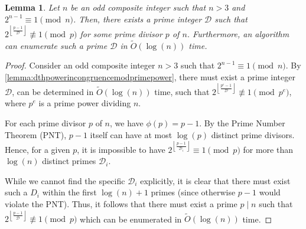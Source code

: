 \documentclass{article}
\theoremstyle{plain}
\theoremstyle{definition}
\newtheorem{lemma}{Lemma}
\newcommand{\floor}[1]{\left\lfloor #1 \right\rfloor}
\newcommand{\totient}[1]{\phi\left({#1}\right)}
\newcommand{\D}{\mathcal{D}}
\newcommand{\primep}{p}
\begin{document}
\begin{lemma}\label{lemma:dthpowerincongruencemodprime}
\textit{Let $n$ be an odd composite integer such that $n > 3$ and $2^{n-1} \equiv 1 \pmod{n}$. Then, there exists a prime integer $\D$ such that $2^{\floor{\frac{\primep-1}{\D}}} \not\equiv 1 \pmod{\primep}$ for some prime divisor $\primep$ of $n$. Furthermore, an algorithm can enumerate such a prime $\D$ in $\tilde{O}(\log(n))$ time.}
\end{lemma}
\begin{proof}
Consider an odd composite integer $n > 3$ such that $2^{n-1} \equiv 1 \pmod{n}$. By \cref{lemma:dthpowerincongruencemodprimepower}, there must exist a prime integer $\D$, can be determined in $\tilde{O}(\log(n))$ time, such that $2^{\left\lfloor\frac{\primep^e-1}{\D}\right\rfloor} \not\equiv 1 \pmod{\primep^e}$, where $\primep^e$ is a prime power dividing $n$.

For each prime divisor $\primep$ of $n$, we have $\totient{\primep} = \primep-1$. By the Prime Number Theorem (PNT), $\primep-1$ itself can have at most $\log(\primep)$ distinct prime divisors. Hence, for a given $\primep$, it is impossible to have $2^{\left\lfloor\frac{\primep-1}{\D_i}\right\rfloor} \equiv 1 \pmod{\primep}$ for more than $\log(n)$ distinct primes $\D_i$.

While we cannot find the specific $\D_i$ explicitly, it is clear that there must exist such a $D_i$ within the first $\log(n)+1$ primes (since otherwise $\primep-1$ would violate the PNT). Thus, it follows that there must exist a prime $\primep \mid n$ such that $2^{\left\lfloor\frac{\primep-1}{\D}\right\rfloor} \not\equiv 1 \pmod{\primep}$ which can be enumerated in $\tilde{O}(\log(n))$ time.
\end{proof}
\end{document}
